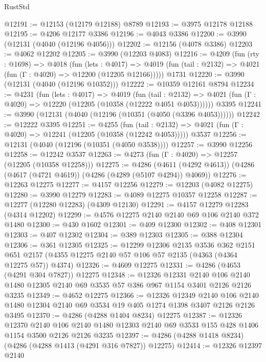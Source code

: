 \begin{lexlean}{RustStd}
\begin{coremodule}
@12191 := @12153 (@12179 @12188) @8789
@12193 := @3975 @12178 @12188
@12195 := @4206 @12177 @3386
@12196 := @4043 @3386
@12200 := @3990 (@12131 (@4040 (@12196 @4056)))
@12202 := @12156 (@4078 @3386)
@12203 := @4062 @12202
@12205 := @3990 (@12203 @4083)
@12216 := @4209
    (fun (rty : @1698) =>
    @4018
      (fun (lets : @4017) =>
      @4019 (fun (tail : @2132) => @4021 (fun (Γ : @4020) => @12200 (@12205 @12166)))))
    @1731
@12220 := @3990 (@12131 (@4040 (@12196 @10352)))
@12222 := @10359 @12161 @8794
@12234 := @4231
    (fun (lets : @4017) =>
    @4019
      (fun (tail : @2132) =>
      @4021 (fun (Γ : @4020) => @12220 (@12205 (@10358 (@12222 @4051 @4053))))))
    @3395
@12241 := @3990 (@12131 (@4040 (@12196 (@10351 (@4050 (@3396 @4053))))))
@12242 := @12222 @3395
@12251 := @4255
    (fun (tail : @2132) => @4021 (fun (Γ : @4020) => @12241 (@12205 (@10358 (@12242 @4053)))))
    @3537
@12256 := @12131 (@4040 (@12196 (@10351 (@4050 @3538))))
@12257 := @3990 @12256
@12258 := @12242 @3537
@12263 := @4273 (fun (Γ : @4020) => @12257 (@12205 (@10358 @12258)))
@12275 := @4286
    (@4611 (@4292 @4613))
    (@4286 (@4617 (@4721 @4619)) (@4286 (@4289 (@5107 @4294)) @4069))
@12276 := @12263 @12275
@12277 := @4157 @12256
@12279 := @12203 (@4082 @12275)
@12280 := @3990 @12279
@12283 := @4089 @12275 @10357 @12258
@12287 := @12277 (@12280 @12283) (@4309 @12130)
@12291 := @4157 @12279 @12283 (@4314 @12202)
@12299 := @4576 @12275 @2140 @2140 @69 @106 @2140 @372 @1480
@12300 := @430 @1602
@12301 := @409 @12300
@12302 := @408 @12301
@12303 := @407 @12302
@12304 := @389 @12303
@12305 := @388 @12304
@12306 := @361 @12305
@12325 := @12299
    @12306
    @2135
    @3536
    @362
    @2151
    @651
    @2157
    (@4355 @12275 @2140 @57 @106 @57 @2135 (@4363 (@4364 @12275 @57)) @4374)
@12326 := @4609 @12275
@12331 := @4286 (@4653 (@4291 @304 @7827)) @12275
@12348 := @12326
    @12331
    @2140
    @106
    @2140
    @1480
    @12305
    @2140
    @69
    @3535
    @57
    @386
    @967
    @1154
    @3401
    @2126
    @2126
    @3235
@12349 := @4652 @12275
@12366 := @12326
    @12349
    @2140
    @106
    @2140
    @1480
    @12304
    @2140
    @69
    @3534
    @19
    @405
    @1274
    @1398
    @3407
    @2126
    @2126
    @3495
@12370 := @4286 (@4288 @1404 @8234) @12275
@12387 := @12326
    @12370
    @2140
    @106
    @2140
    @1480
    @12303
    @2140
    @69
    @3533
    @155
    @428
    @1406
    @1154
    @3500
    @2126
    @2126
    @3235
@12397 := @4286 (@4288 @1418 @8234) (@4286 (@4288 @1413 (@4291 @316 @7827)) @12275)
@12414 := @12326
    @12397
    @2140

\end{coremodule}
\end{lexlean}
